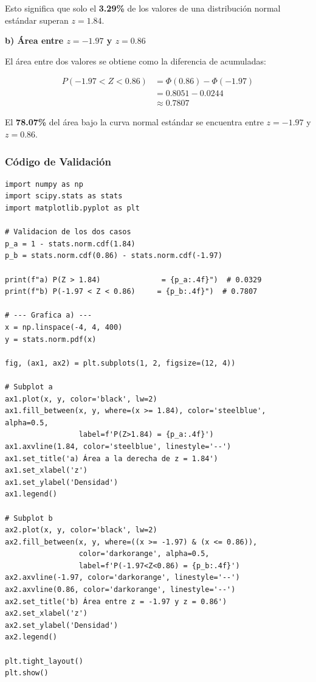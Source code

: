 \documentclass[12pt,a4paper]{article}
\begin{document}
Esto significa que solo el \textbf{3.29\%} de los valores de una distribución normal
estándar superan $z = 1.84$.
 
\textbf{b) Área entre $z = -1.97$ y $z = 0.86$}
 
El área entre dos valores se obtiene como la diferencia de acumuladas:
 
\begin{align}
    P(-1.97 < Z < 0.86) &= \Phi(0.86) - \Phi(-1.97) \\
                         &= 0.8051 - 0.0244 \\
                         &\approx \boxed{0.7807}
\end{align}
 
El \textbf{78.07\%} del área bajo la curva normal estándar se encuentra entre
$z = -1.97$ y $z = 0.86$.
 
\subsubsection*{Código de Validación}
 
\begin{lstlisting}
import numpy as np
import scipy.stats as stats
import matplotlib.pyplot as plt
 
# Validacion de los dos casos
p_a = 1 - stats.norm.cdf(1.84)
p_b = stats.norm.cdf(0.86) - stats.norm.cdf(-1.97)
 
print(f"a) P(Z > 1.84)              = {p_a:.4f}")  # 0.0329
print(f"b) P(-1.97 < Z < 0.86)     = {p_b:.4f}")  # 0.7807
 
# --- Grafica a) ---
x = np.linspace(-4, 4, 400)
y = stats.norm.pdf(x)
 
fig, (ax1, ax2) = plt.subplots(1, 2, figsize=(12, 4))
 
# Subplot a
ax1.plot(x, y, color='black', lw=2)
ax1.fill_between(x, y, where=(x >= 1.84), color='steelblue', alpha=0.5,
                 label=f'P(Z>1.84) = {p_a:.4f}')
ax1.axvline(1.84, color='steelblue', linestyle='--')
ax1.set_title('a) Área a la derecha de z = 1.84')
ax1.set_xlabel('z')
ax1.set_ylabel('Densidad')
ax1.legend()
 
# Subplot b
ax2.plot(x, y, color='black', lw=2)
ax2.fill_between(x, y, where=((x >= -1.97) & (x <= 0.86)),
                 color='darkorange', alpha=0.5,
                 label=f'P(-1.97<Z<0.86) = {p_b:.4f}')
ax2.axvline(-1.97, color='darkorange', linestyle='--')
ax2.axvline(0.86, color='darkorange', linestyle='--')
ax2.set_title('b) Área entre z = -1.97 y z = 0.86')
ax2.set_xlabel('z')
ax2.set_ylabel('Densidad')
ax2.legend()
 
plt.tight_layout()
plt.show()
\end{lstlisting}
 
\end{document}
